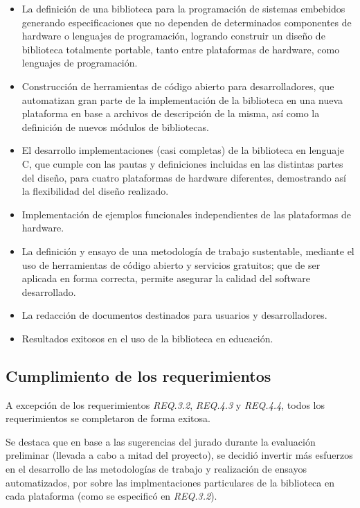 \begin{itemize}
\item
La definición de una biblioteca para la programación de sistemas embebidos generando especificaciones que no dependen de determinados componentes de hardware o lenguajes de programación, logrando construir un diseño de biblioteca totalmente portable, tanto entre plataformas de hardware, como lenguajes de programación.
\item
Construcción de herramientas de código abierto para desarrolladores, que automatizan gran parte de la implementación de la biblioteca en una nueva plataforma en base a archivos de descripción de la misma, así como la definición de nuevos módulos de bibliotecas.
\item
El desarrollo implementaciones (casi completas) de la biblioteca en lenguaje C, que cumple con las pautas y definiciones incluidas en las distintas partes del diseño, para cuatro plataformas de hardware diferentes, demostrando así la flexibilidad del diseño realizado. 
\item
Implementación de ejemplos funcionales independientes de las plataformas de hardware.
\item
La definición y ensayo de una metodología de trabajo sustentable, mediante el uso de herramientas de código abierto y servicios gratuitos; que de ser aplicada en forma correcta, permite asegurar la calidad del software desarrollado.
\item
La redacción de documentos destinados para usuarios y desarrolladores.
\item
Resultados exitosos en el uso de la biblioteca en educación.
\end{itemize}

\subsection{Cumplimiento de los requerimientos}

A excepción de los requerimientos \emph{REQ.3.2}, \emph{REQ.4.3} y \emph{REQ.4.4}, todos los requerimientos se completaron de forma exitosa.

Se destaca que en base a las sugerencias del jurado durante la evaluación preliminar (llevada a cabo a mitad del proyecto), se decidió invertir más esfuerzos en el desarrollo de las metodologías de trabajo y realización de ensayos automatizados, por sobre las implmentaciones particulares de la biblioteca en cada plataforma (como se especificó en \emph{REQ.3.2}). 

